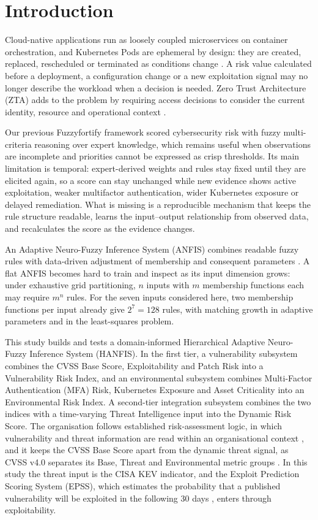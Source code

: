 \documentclass[referee,lineno,pdflatex,sn-basic]{sn-jnl}%
\theoremstyle{thmstyleone}%
\theoremstyle{thmstyletwo}%
\theoremstyle{thmstylethree}%
\begin{document}
\section{Introduction}\label{sec1}
Cloud-native applications run as loosely coupled microservices on container orchestration, and Kubernetes Pods are ephemeral by design: they are created, replaced, rescheduled or terminated as conditions change \citep{nist_microservices_2019,kubernetes_pod_lifecycle_2026}. A risk value calculated before a deployment, a configuration change or a new exploitation signal may no longer describe the workload when a decision is needed. Zero Trust Architecture (ZTA) adds to the problem by requiring access decisions to consider the current identity, resource and operational context \citep{nist_zta_2020,nist_zta_cloudnative_2023}.

Our previous Fuzzyfortify framework \citep{bib1} scored cybersecurity risk with fuzzy multi-criteria reasoning over expert knowledge, which remains useful when observations are incomplete and priorities cannot be expressed as crisp thresholds. Its main limitation is temporal: expert-derived weights and rules stay fixed until they are elicited again, so a score can stay unchanged while new evidence shows active exploitation, weaker multifactor authentication, wider Kubernetes exposure or delayed remediation. What is missing is a reproducible mechanism that keeps the rule structure readable, learns the input--output relationship from observed data, and recalculates the score as the evidence changes.

An Adaptive Neuro-Fuzzy Inference System (ANFIS) combines readable fuzzy rules with data-driven adjustment of membership and consequent parameters \citep{jang1993anfis}. A flat ANFIS becomes hard to train and inspect as its input dimension grows: under exhaustive grid partitioning, $n$ inputs with $m$ membership functions each may require $m^n$ rules. For the seven inputs considered here, two membership functions per input already give $2^7=128$ rules, with matching growth in adaptive parameters and in the least-squares problem.

This study builds and tests a domain-informed Hierarchical Adaptive Neuro-Fuzzy Inference System (HANFIS). In the first tier, a vulnerability subsystem combines the CVSS Base Score, Exploitability and Patch Risk into a Vulnerability Risk Index, and an environmental subsystem combines Multi-Factor Authentication (MFA) Risk, Kubernetes Exposure and Asset Criticality into an Environmental Risk Index. A second-tier integration subsystem combines the two indices with a time-varying Threat Intelligence input into the Dynamic Risk Score. The organisation follows established risk-assessment logic, in which vulnerability and threat information are read within an organisational context \citep{nist_risk_2012}, and it keeps the CVSS Base Score apart from the dynamic threat signal, as CVSS v4.0 separates its Base, Threat and Environmental metric groups \citep{first_cvss40}. In this study the threat input is the CISA KEV indicator, and the Exploit Prediction Scoring System (EPSS), which estimates the probability that a published vulnerability will be exploited in the following 30 days \citep{first_epss}, enters through exploitability.
\end{document}
